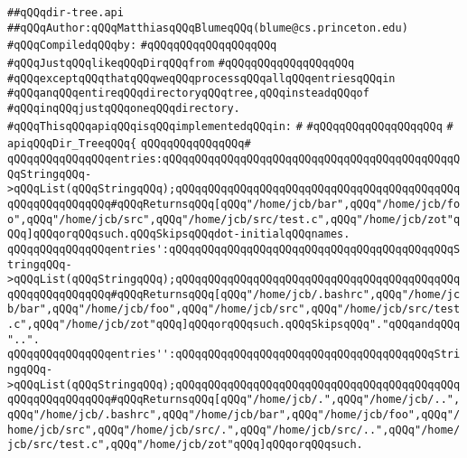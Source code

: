 \label{src/lib/src/dir-tree.api}
\verb|##qQQqdir-tree.api|\newline
\verb|##qQQqAuthor:qQQqMatthiasqQQqBlumeqQQq(blume@cs.princeton.edu)|\newline
\newline
\verb|#qQQqCompiledqQQqby:|\newline
\verb|#qQQqqQQqqQQqqQQqqQQq|\newline
\newline
\verb|#qQQqJustqQQqlikeqQQqDirqQQqfrom|\newline
\verb|#qQQqqQQqqQQqqQQqqQQq|\newline
\verb|#qQQqexceptqQQqthatqQQqweqQQqprocessqQQqallqQQqentriesqQQqin|\newline
\verb|#qQQqanqQQqentireqQQqdirectoryqQQqtree,qQQqinsteadqQQqof|\newline
\verb|#qQQqinqQQqjustqQQqoneqQQqdirectory.|\newline
\newline
\verb|#qQQqThisqQQqapiqQQqisqQQqimplementedqQQqin:|\newline
\verb|#|\newline
\verb|#qQQqqQQqqQQqqQQqqQQq|\newline
\verb|#|\newline
\verb|apiqQQqDir_TreeqQQq{|\newline
\verb|qQQqqQQqqQQqqQQq#|\newline
\verb|qQQqqQQqqQQqqQQqentries:qQQqqQQqqQQqqQQqqQQqqQQqqQQqqQQqqQQqqQQqqQQqqQQqStringqQQq->qQQqList(qQQqStringqQQq);qQQqqQQqqQQqqQQqqQQqqQQqqQQqqQQqqQQqqQQqqQQqqQQqqQQqqQQqqQQq#qQQqReturnsqQQq[qQQq"/home/jcb/bar",qQQq"/home/jcb/foo",qQQq"/home/jcb/src",qQQq"/home/jcb/src/test.c",qQQq"/home/jcb/zot"qQQq]qQQqorqQQqsuch.qQQqSkipsqQQqdot-initialqQQqnames.|\newline
\verb|qQQqqQQqqQQqqQQqentries':qQQqqQQqqQQqqQQqqQQqqQQqqQQqqQQqqQQqqQQqqQQqStringqQQq->qQQqList(qQQqStringqQQq);qQQqqQQqqQQqqQQqqQQqqQQqqQQqqQQqqQQqqQQqqQQqqQQqqQQqqQQqqQQq#qQQqReturnsqQQq[qQQq"/home/jcb/.bashrc",qQQq"/home/jcb/bar",qQQq"/home/jcb/foo",qQQq"/home/jcb/src",qQQq"/home/jcb/src/test.c",qQQq"/home/jcb/zot"qQQq]qQQqorqQQqsuch.qQQqSkipsqQQq"."qQQqandqQQq"..".|\newline
\verb|qQQqqQQqqQQqqQQqentries'':qQQqqQQqqQQqqQQqqQQqqQQqqQQqqQQqqQQqqQQqStringqQQq->qQQqList(qQQqStringqQQq);qQQqqQQqqQQqqQQqqQQqqQQqqQQqqQQqqQQqqQQqqQQqqQQqqQQqqQQqqQQq#qQQqReturnsqQQq[qQQq"/home/jcb/.",qQQq"/home/jcb/..",qQQq"/home/jcb/.bashrc",qQQq"/home/jcb/bar",qQQq"/home/jcb/foo",qQQq"/home/jcb/src",qQQq"/home/jcb/src/.",qQQq"/home/jcb/src/..",qQQq"/home/jcb/src/test.c",qQQq"/home/jcb/zot"qQQq]qQQqorqQQqsuch.|\newline
